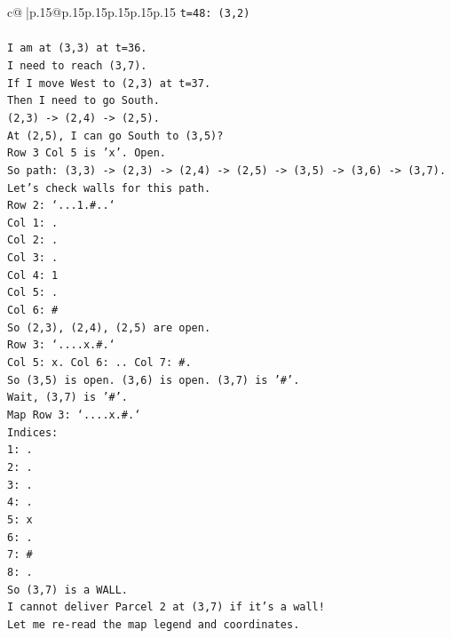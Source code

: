 \documentclass{article}
\begin{document}
{\begin{supertabular}{c@{$\;$}|p{.15\linewidth}@{}p{.15\linewidth}p{.15\linewidth}p{.15\linewidth}p{.15\linewidth}p{.15\linewidth}}
{{{\texttt{t=48: (3,2)} \\
\\ 
\texttt{I am at (3,3) at t=36.} \\
\texttt{I need to reach (3,7).} \\
\texttt{If I move West to (2,3) at t=37.} \\
\texttt{Then I need to go South.} \\
\texttt{(2,3) {-}> (2,4) {-}> (2,5).} \\
\texttt{At (2,5), I can go South to (3,5)?} \\
\texttt{Row 3 Col 5 is 'x'. Open.} \\
\texttt{So path: (3,3) {-}> (2,3) {-}> (2,4) {-}> (2,5) {-}> (3,5) {-}> (3,6) {-}> (3,7).} \\
\texttt{Let's check walls for this path.} \\
\texttt{Row 2: `...1.\#..`} \\
\texttt{Col 1: .} \\
\texttt{Col 2: .} \\
\texttt{Col 3: .} \\
\texttt{Col 4: 1} \\
\texttt{Col 5: .} \\
\texttt{Col 6: \#} \\
\texttt{So (2,3), (2,4), (2,5) are open.} \\
\texttt{Row 3: `....x.\#.`} \\
\texttt{Col 5: x. Col 6: .. Col 7: \#.} \\
\texttt{So (3,5) is open. (3,6) is open. (3,7) is '\#'.} \\
\texttt{Wait, (3,7) is '\#'.} \\
\texttt{Map Row 3: `....x.\#.`} \\
\texttt{Indices:} \\
\texttt{1: .} \\
\texttt{2: .} \\
\texttt{3: .} \\
\texttt{4: .} \\
\texttt{5: x} \\
\texttt{6: .} \\
\texttt{7: \#} \\
\texttt{8: .} \\
\texttt{So (3,7) is a WALL.} \\
\texttt{I cannot deliver Parcel 2 at (3,7) if it's a wall!} \\
\texttt{Let me re{-}read the map legend and coordinates.} \\
}}}
\end{supertabular}}
\end{document}
